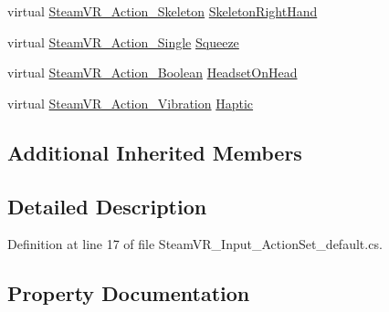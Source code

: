\begin{DoxyCompactItemize}
virtual \mbox{\hyperlink{class_valve_1_1_v_r_1_1_steam_v_r___action___skeleton}{Steam\+V\+R\+\_\+\+Action\+\_\+\+Skeleton}} \mbox{\hyperlink{class_valve_1_1_v_r_1_1_steam_v_r___input___action_set__default_aae46e8642019f60321fec58ab00926e2}{Skeleton\+Right\+Hand}}
\item 
virtual \mbox{\hyperlink{class_valve_1_1_v_r_1_1_steam_v_r___action___single}{Steam\+V\+R\+\_\+\+Action\+\_\+\+Single}} \mbox{\hyperlink{class_valve_1_1_v_r_1_1_steam_v_r___input___action_set__default_a7143c3825b03e674cfbcb81321a4e0ea}{Squeeze}}
\item 
virtual \mbox{\hyperlink{class_valve_1_1_v_r_1_1_steam_v_r___action___boolean}{Steam\+V\+R\+\_\+\+Action\+\_\+\+Boolean}} \mbox{\hyperlink{class_valve_1_1_v_r_1_1_steam_v_r___input___action_set__default_aec9d893b45e0705fa71b0b4dd05a80be}{Headset\+On\+Head}}
\item 
virtual \mbox{\hyperlink{class_valve_1_1_v_r_1_1_steam_v_r___action___vibration}{Steam\+V\+R\+\_\+\+Action\+\_\+\+Vibration}} \mbox{\hyperlink{class_valve_1_1_v_r_1_1_steam_v_r___input___action_set__default_a91f2c4c27462284108c1b852c74bb3aa}{Haptic}}
\end{DoxyCompactItemize}
\subsection*{Additional Inherited Members}


\subsection{Detailed Description}


Definition at line 17 of file Steam\+V\+R\+\_\+\+Input\+\_\+\+Action\+Set\+\_\+default.\+cs.



\subsection{Property Documentation}
\mbox{\label{class_valve_1_1_v_r_1_1_steam_v_r___input___action_set__default_a4ba6486378feb0fc40aa8acd469fc056}} 
